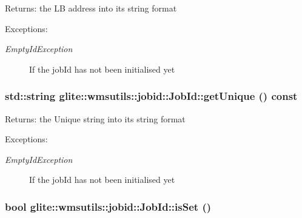 \begin{Desc}
\item[Returns:]the LB address into its string format \end{Desc}
\begin{Desc}
\item[Exceptions:]
\begin{description}
\item[{\em Empty\-Id\-Exception}]If the job\-Id has not been initialised yet \end{description}
\end{Desc}
\hypertarget{classglite_1_1wmsutils_1_1jobid_1_1JobId_z5_1}{
\subsubsection[getUnique]{\setlength{\rightskip}{0pt plus 5cm}std::string glite::wmsutils::jobid::Job\-Id::get\-Unique () const}}
\label{classglite_1_1wmsutils_1_1jobid_1_1JobId_z5_1}


\begin{Desc}
\item[Returns:]the Unique string into its string format \end{Desc}
\begin{Desc}
\item[Exceptions:]
\begin{description}
\item[{\em Empty\-Id\-Exception}]If the job\-Id has not been initialised yet \end{description}
\end{Desc}
\hypertarget{classglite_1_1wmsutils_1_1jobid_1_1JobId_z3_1}{
\subsubsection[isSet]{\setlength{\rightskip}{0pt plus 5cm}bool glite::wmsutils::jobid::Job\-Id::is\-Set ()}}
\label{classglite_1_1wmsutils_1_1jobid_1_1JobId_z3_1}


